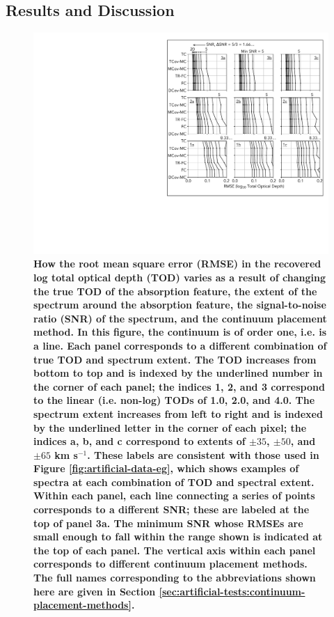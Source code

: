 \documentclass[trackchanges]{aastex62}
\begin{document}
{\color{red} \bf
\subsection{Results and Discussion}

\begin{figure}
  \includegraphics[width=\linewidth]{figures/annotated_co1_RMSEs_vs_SNR.pdf}
  \caption{
  \bf \color{red}
  How the root mean square error (RMSE) in the recovered log total optical depth (TOD) varies as a result of changing the true TOD of the absorption feature, the extent of the spectrum around the absorption feature, the signal-to-noise ratio (SNR) of the spectrum, and the continuum placement method.
  In this figure, the continuum is of order one, i.e. is a line.
  Each panel corresponds to a different combination of true TOD and spectrum extent.
  The TOD increases from bottom to top and is indexed by the underlined number in the corner of each panel; the indices 1, 2, and 3 correspond to the linear (i.e. non-log) TODs of 1.0, 2.0, and 4.0. The spectrum extent increases from left to right and is indexed by the underlined letter in the corner of each pixel; the indices a, b, and c correspond to extents of $\pm 35$, $\pm 50$, and $\pm 65$ km s$^{-1}$. These labels are consistent with those used in Figure \ref{fig:artificial-data-eg}, which shows examples of spectra at each combination of TOD and spectral extent.
  Within each panel, each line connecting a series of points corresponds to a different SNR; these are labeled at the top of panel 3a. The minimum SNR whose RMSEs are small enough to fall within the range shown is indicated at the top of each panel.
  The vertical axis within each panel corresponds to different continuum placement methods. The full names corresponding to the abbreviations shown here are given in Section \ref{sec:artificial-tests:continuum-placement-methods}.
  }
  \label{fig:outcomes-CO-1}
\end{figure}

}
\end{document}
